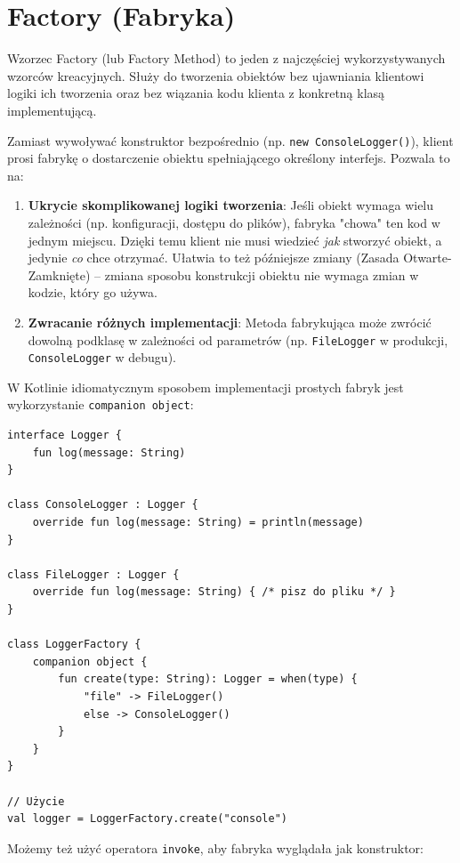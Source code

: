 \section{Factory (Fabryka)}

Wzorzec Factory (lub Factory Method) to jeden z najczęściej wykorzystywanych wzorców kreacyjnych. Służy do tworzenia obiektów bez ujawniania klientowi logiki ich tworzenia oraz bez wiązania kodu klienta z konkretną klasą implementującą.

Zamiast wywoływać konstruktor bezpośrednio (np. \texttt{new ConsoleLogger()}), klient prosi fabrykę o dostarczenie obiektu spełniającego określony interfejs. Pozwala to na:
\begin{enumerate}
    \item \textbf{Ukrycie skomplikowanej logiki tworzenia}: Jeśli obiekt wymaga wielu zależności (np. konfiguracji, dostępu do plików), fabryka "chowa" ten kod w jednym miejscu. Dzięki temu klient nie musi wiedzieć \textit{jak} stworzyć obiekt, a jedynie \textit{co} chce otrzymać. Ułatwia to też późniejsze zmiany (Zasada Otwarte-Zamknięte) – zmiana sposobu konstrukcji obiektu nie wymaga zmian w kodzie, który go używa.
    \item \textbf{Zwracanie różnych implementacji}: Metoda fabrykująca może zwrócić dowolną podklasę w zależności od parametrów (np. \texttt{FileLogger} w produkcji, \texttt{ConsoleLogger} w debugu).
\end{enumerate}

W Kotlinie idiomatycznym sposobem implementacji prostych fabryk jest wykorzystanie \texttt{companion object}:

\begin{verbatim}
interface Logger {
    fun log(message: String)
}

class ConsoleLogger : Logger {
    override fun log(message: String) = println(message)
}

class FileLogger : Logger {
    override fun log(message: String) { /* pisz do pliku */ }
}

class LoggerFactory {
    companion object {
        fun create(type: String): Logger = when(type) {
            "file" -> FileLogger()
            else -> ConsoleLogger()
        }
    }
}

// Użycie
val logger = LoggerFactory.create("console")
\end{verbatim}

Możemy też użyć operatora \texttt{invoke}, aby fabryka wyglądała jak konstruktor:

